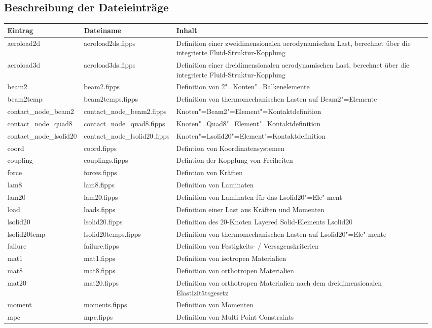 \documentclass[11pt,titlepage,listof=totoc,bibliography=totoc,twoside]{scrreprt}
\begin{document}
{{\subsection{Beschreibung der Dateieinträge}

\begin{tabularx}{\textwidth}{llX}
\toprule
Eintrag			& Dateiname			& Inhalt	\\
\midrule
aeroload2d		& aeroload2ds.fipps		& Definition einer zweidimensionalen aerodynamischen Last, berechnet über die integrierte Fluid-Struktur-Kopplung	\\
aeroload3d		& aeroload3ds.fipps		& Definition einer dreidimensionalen aerodynamischen Last, berechnet über die integrierte Fluid-Struktur-Kopplung	\\
beam2			& beam2.fipps			& Definition von 2"=Konten"=Balkenelemente	\\
beam2temp		& beam2temps.fipps		& Definition von thermomechanischen Lasten auf Beam2"=Elemente \\
contact\_node\_beam2	& contact\_node\_beam2.fipps	& Knoten"=Beam2"=Element"=Kontaktdefinition	\\
contact\_node\_quad8	& contact\_node\_quad8.fipps	& Knoten"=Quad8"=Element"=Kontaktdefinition	\\
contact\_node\_lsolid20	& contact\_node\_lsolid20.fipps	& Knoten"=Lsolid20"=Element"=Kontaktdefinition	\\
coord			& coord.fipps			& Defintion von Koordinatensystemen	\\
coupling		& couplings.fipps		& Defintion der Kopplung von Freiheiten	\\
force			& forces.fipps			& Defintion von Kräften	\\
lam8			& lam8.fipps			& Definition von Laminaten	\\
lam20			& lam20.fipps			& Definition von Laminaten für das Lsolid20"=Ele"-ment	\\
load			& loads.fipps			& Definition einer Last aus Kräften und Momenten \\
lsolid20 		& lsolid20.fipps		& Definition des 20-Knoten Layered Solid-Elements Lsolid20	\\
lsolid20temp		& lsolid20temps.fipps		& Definition von thermomechanischen Lasten auf Lsolid20"=Ele"-mente \\
failure			& failure.fipps			& Definition von Festigkeits- / Versagenskriterien	\\
mat1			& mat1.fipps			& Definition von isotropen Materialien	\\
mat8			& mat8.fipps			& Definition von orthotropen Materialien	\\
mat20			& mat20.fipps			& Definition von orthotropen Materialien nach dem dreidimensionalen Elastizitätsgesetz	\\
moment			& moments.fipps			& Definition von Momenten	\\
mpc			& mpc.fipps			& Definition von Multi Point Constraints	\\
\bottomrule
\end{tabularx}

}}
\end{document}

